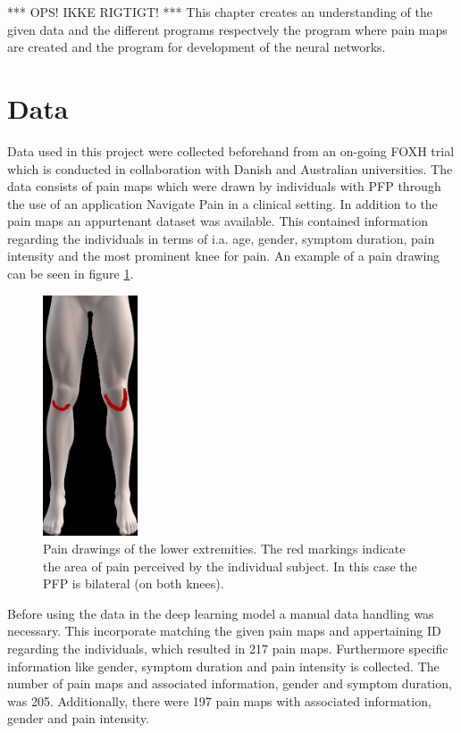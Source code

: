 *** OPS! IKKE RIGTIGT! ***
This chapter creates an understanding of the given data and the different programs respectvely the program where pain maps are created and the program for development of the neural networks. 

\section{Data}
Data used in this project were collected beforehand from an on-going FOXH trial which is conducted in collaboration with Danish and Australian universities. The data consists of pain maps which were drawn by individuals with PFP through the use of an application Navigate Pain in a clinical setting. In addition to the pain maps an appurtenant dataset was available. This contained information regarding the individuals in terms of i.a. age, gender, symptom duration, pain intensity and the most prominent knee for pain. An example of a pain drawing can be seen in figure \ref{fig:kneepainmap}.

\begin{figure} [H]
\centering
\includegraphics[width=0.25\textwidth]{figures/kneepainmap}
\caption{Pain drawings of the lower extremities. The red markings indicate the area of pain perceived by the individual subject. In this case the PFP is bilateral (on both knees).}
\label{fig:kneepainmap}
\end{figure}

\noindent
Before using the data in the deep learning model a manual data handling was necessary. This incorporate matching the given pain maps and appertaining ID regarding the individuals, which resulted in 217 pain maps. Furthermore specific information like gender, symptom duration and pain intensity is collected. The number of pain maps and associated information, gender and symptom duration, was 205. Additionally, there were 197 pain maps with associated information, gender and pain intensity.


